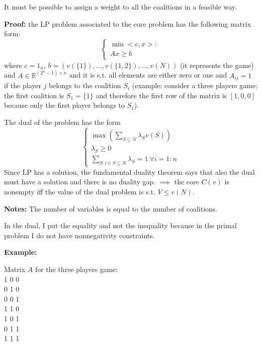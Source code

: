 \noindent It must be possible to assign a weight to all the coalitions in a feasible way.

\bigskip
\noindent \textbf{Proof:} the LP problem associated to the core problem has the following matrix form:
\begin{equation*}
	\begin{cases}
		\min<c,x>:\\
		Ax \geq b
	\end{cases}
\end{equation*}
where $c = 1_n$, $b = (v(\{1\}), ..., v(\{1,2\}), ..., v(N))$ (it represents the game) and $A \in \mathbb{R}^{(2^n-1) \times n}$ and it is s.t. all elements are either zero or one and $A_{ij} = 1$ if the player $j$ belongs to the coalition $S_i$ (example: consider a three players game; the first coalition is $S_1 = \{1\}$ and therefore the first row of the matrix is $[1,0,0]$ because only the first player belongs to $S_1$).

\noindent The dual of the problem has the form
\begin{equation*}
	\begin{cases}
		\max\left(\sum_{S \subseteq N}\lambda_Sv(S)\right)\\
		\lambda_S \geq 0\\
		\sum_{S: i \in S \subseteq N}\lambda_S = 1 ~\forall i=1:n
	\end{cases}
\end{equation*} 
Since LP has a solution, the fundamental duality theorem says that also the dual must have a solution and there is no duality gap. $\implies$ the core $C(v)$ is nonempty iff the value of the dual problem is s.t. $V \leq v(N)$.

\bigskip
\noindent \textbf{Notes:}
\noindent The number of variables is equal to the number of coalitions.

\noindent In the dual, I put the equality and not the inequality because in the 
primal problem I do not have nonnegativity constraints.

\bigskip
\noindent \textbf{Example:}

\noindent Matrix $A$ for the three players game:\\
1	0	0\\
0	1	0\\
0	0	1\\
1	1	0\\
1	0	1\\
0	1	1\\
1	1	1\\


